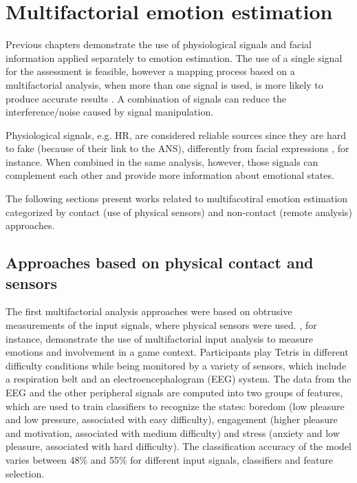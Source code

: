 \chapter{Multifactorial emotion estimation}
\label{ch:literature-multifactorial}

Previous chapters demonstrate the use of physiological signals and facial information applied separately to emotion estimation. The use of a single signal for the assessment is feasible, however a mapping process based on a multifactorial analysis, when more than one signal is used, is more likely to produce accurate results \parencite{kukolja2014comparative}. A combination of signals can reduce the interference/noise caused by signal manipulation.

Physiological signals, e.g. HR, are considered reliable sources since they are hard to fake (because of their link to the ANS), differently from facial expressions \parencite{Landowska}, for instance. When combined in the same analysis, however, those signals can complement each other and provide more information about emotional states.

The following sections present works related to multifacotiral emotion estimation categorized by contact (use of physical sensors) and non-contact (remote analysis) approaches.

\section{Approaches based on physical contact and sensors}

The first multifactorial analysis approaches were based on obtrusive measurements of the input signals, where physical sensors were used. \textcite{Chanel_2011}, for instance, demonstrate the use of multifactorial input analysis to measure emotions and involvement in a game context. Participants play Tetris in different difficulty conditions while being monitored by a variety of sensors, which include a respiration belt and an electroencephalogram (EEG) system. The data from the EEG and the other peripheral signals are computed into two groups of features, which are used to train classifiers to recognize the states: boredom (low pleasure and low pressure, associated with easy difficulty), engagement (higher pleasure and motivation, associated with medium difficulty) and stress (anxiety and low pleasure, associated with hard difficulty). The classification accuracy of the model varies between 48\% and 55\% for different input signals, classifiers and feature selection.

